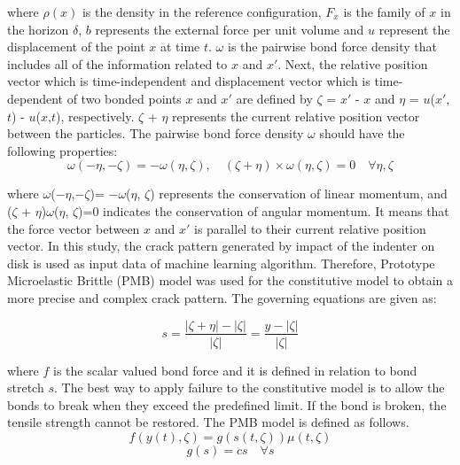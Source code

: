 \noindent where $\rho(x)$ is the density in the reference configuration, $F_x$ is the family of $x$ in the horizon $\delta$, $b$ represents the external force per unit volume and $u$ represent the displacement of the point $x$ at time $t$. $\omega$ is the pairwise bond force density that includes all of the information related to $x$ and ${x'}$. Next, the relative position vector which is time-independent and displacement vector which is time-dependent of two bonded points $x$ and ${x'}$ are defined by $\zeta$ = ${x'}$ - $x$ and $\eta$ = $u$(${x'}$,$t$) - $u$($x$,$t$), respectively. $\zeta$ + $\eta$ represents the current relative position vector between the particles. The pairwise bond force density $\omega$ should have the following properties: 
\begin{equation}
\omega(-\eta,-\zeta)= -\omega(\eta, \zeta),\quad(\zeta + \eta)\times\omega(\eta, \zeta)=0 \quad\forall\eta,\zeta
\end{equation}




\noindent where $\omega$($-\eta$,$-\zeta$)= $-\omega$($\eta$, $\zeta$) represents the conservation of linear momentum, and ($\zeta$ + $\eta$)\times$\omega$($\eta$, $\zeta$)=0 indicates the conservation of angular momentum. It means that the force vector between $x$ and ${x'}$ is parallel to their current relative position vector. In this study, the crack pattern generated by impact of the indenter on disk is used as input data of machine learning algorithm. Therefore, Prototype Microelastic Brittle (PMB) model \cite{Ref4} was used for the constitutive model to obtain a more precise and complex crack pattern. The governing equations are given as: 

\begin{equation}
s=\frac{|\zeta+\eta|-|\zeta|}{|\zeta|}=\frac{y-|\zeta|}{|\zeta|}
\end{equation}

\noindent where $f$ is the scalar valued bond force and it is defined in relation to bond stretch $s$. The best way to apply failure to the constitutive model is to allow the bonds to break when they exceed the predefined limit. If the bond is broken, the tensile strength cannot be restored. The PMB model is defined as follows.
\begin{equation}
f(y(t),\zeta)=g(s(t,\zeta))\mu(t,\zeta)
\end{equation}
\begin{equation}
g(s)=cs \quad\forall s
\end{equation}

